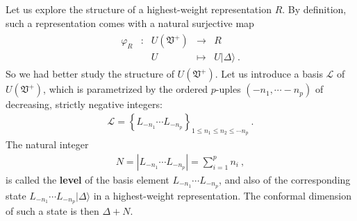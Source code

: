 \documentclass[12pt,a4paper,notitlepage]{report}
\numberwithin{equation}{section}
\theoremstyle{break}
\begin{document}
Let us explore the structure of a highest-weight representation $R$. By definition, such a representation comes with a natural surjective map
\begin{align}
\begin{array}{cclcl}
 \varphi_R & : & U(\mathfrak{V}^+) & \rightarrow & R 
\\
 &  & U & \mapsto & U|\Delta\rangle \ .
\end{array}
\label{pur}
\end{align}
So we had better study the structure of $U(\mathfrak{V}^+)$. Let us introduce a basis $\mathcal{L}$ of $U(\mathfrak{V}^+)$, which is parametrized by the ordered $p$-uples $(-n_1,\cdots -n_p)$ of decreasing, strictly negative integers:
\begin{align}
\mathcal{L} =   \left\{ L_{-n_1} \cdots L_{-n_p}  \right\}_{1\leq n_1\leq n_2\leq \cdots n_p} \ .
\label{lels}
\end{align}
The natural integer
\begin{align}
 N=\left|L_{-n_1} \cdots L_{-n_p}\right|=\sum_{i=1}^p n_i \ ,
\label{nsn}
\end{align}
is called the \textbf{level} of the basis element $L_{-n_1} \cdots L_{-n_p}$, and also of the corresponding state $L_{-n_1} \cdots L_{-n_p}|\Delta\rangle$ in a highest-weight representation. The conformal dimension of such a state is then $\Delta+N$. 
\end{document}
